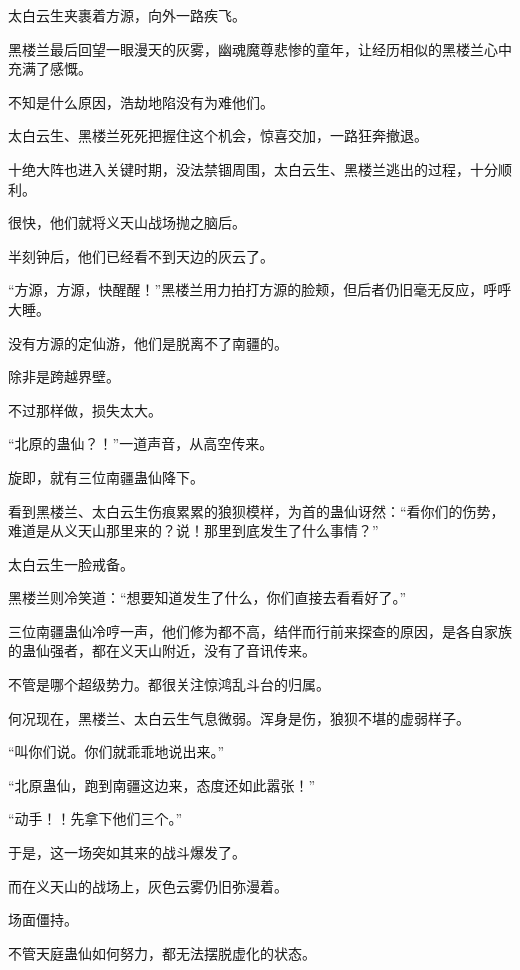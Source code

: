 
\begin{this_body}



太白云生夹裹着方源，向外一路疾飞。

黑楼兰最后回望一眼漫天的灰雾，幽魂魔尊悲惨的童年，让经历相似的黑楼兰心中充满了感慨。

不知是什么原因，浩劫地陷没有为难他们。

太白云生、黑楼兰死死把握住这个机会，惊喜交加，一路狂奔撤退。

十绝大阵也进入关键时期，没法禁锢周围，太白云生、黑楼兰逃出的过程，十分顺利。

很快，他们就将义天山战场抛之脑后。

半刻钟后，他们已经看不到天边的灰云了。

“方源，方源，快醒醒！”黑楼兰用力拍打方源的脸颊，但后者仍旧毫无反应，呼呼大睡。

没有方源的定仙游，他们是脱离不了南疆的。

除非是跨越界壁。

不过那样做，损失太大。

“北原的蛊仙？！”一道声音，从高空传来。

旋即，就有三位南疆蛊仙降下。

看到黑楼兰、太白云生伤痕累累的狼狈模样，为首的蛊仙讶然：“看你们的伤势，难道是从义天山那里来的？说！那里到底发生了什么事情？”

太白云生一脸戒备。

黑楼兰则冷笑道：“想要知道发生了什么，你们直接去看看好了。”

三位南疆蛊仙冷哼一声，他们修为都不高，结伴而行前来探查的原因，是各自家族的蛊仙强者，都在义天山附近，没有了音讯传来。

不管是哪个超级势力。都很关注惊鸿乱斗台的归属。

何况现在，黑楼兰、太白云生气息微弱。浑身是伤，狼狈不堪的虚弱样子。

“叫你们说。你们就乖乖地说出来。”

“北原蛊仙，跑到南疆这边来，态度还如此嚣张！”

“动手！！先拿下他们三个。”

于是，这一场突如其来的战斗爆发了。

而在义天山的战场上，灰色云雾仍旧弥漫着。

场面僵持。

不管天庭蛊仙如何努力，都无法摆脱虚化的状态。


\end{this_body}
